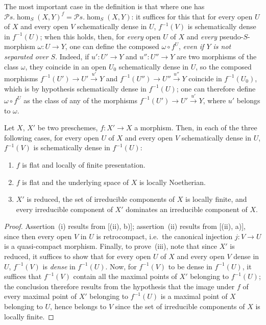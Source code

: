\begin{env}[20.3.4]
\label{IV.20.3.4}
The most important case in the definition  is that where one has $\mathscr{P}\!s.\!\operatorname{hom}_S(X,Y)^f=\mathscr{P}\!s.\!\operatorname{hom}_S(X,Y)$:
it suffices for this that for every open $U$ of $X$ and every open $V$ schematically dense in $U$, $f^{-1}(V)$ is schematically dense in $f^{-1}(U)$;
when this holds, then, for \emph{every} open $U$ of $X$ and \emph{every} pseudo-$S$-morphism $\omega:U\to Y$, one can define the composed $\omega\circ f^U$, \emph{even if $Y$ is not separated over $S$}.
Indeed, if $u':U'\to Y$ and $u'':U''\to Y$ are two morphisms of the class $\omega$, they coincide in an open $U_0$ schematically dense in $U$, so the composed morphisms $f^{-1}(U')\to U'\xrightarrow{u'}Y$ and $f^{-1}(U'')\to U''\xrightarrow{u''}Y$ coincide in $f^{-1}(U_0)$, which is by hypothesis schematically dense in $f^{-1}(U)$;
one can therefore define $\omega\circ f^U$ as the class of any of the morphisms $f^{-1}(U')\to U'\xrightarrow{u'}Y$, where $u'$ belongs to $\omega$.
\end{env}

\begin{proposition}[20.3.5]
\label{IV.20.3.5}
Let $X$, $X'$ be two preschemes, $f:X'\to X$ a morphism.
Then, in each of the three following cases, for every open $U$ of $X$ and every open $V$ schematically dense in $U$, $f^{-1}(V)$ is schematically dense in $f^{-1}(U)$:
\begin{enumerate}[label=\emph{(\roman*)}]
  \item $f$ is flat and locally of finite presentation.
  \item $f$ is flat and the underlying space of $X$ is locally Noetherian.
  \item $X'$ is reduced, the set of irreducible components of $X$ is locally finite, and every irreducible component of $X'$ dominates an irreducible component of $X$.
\end{enumerate}
\end{proposition}

\begin{proof}
Assertion~(i) results from [(ii), b)];
assertion~(ii) results from [(ii), a)], since then every open $V$ in $U$ is retrocompact, i.e.\ the canonical injection $j:V\to U$ is a quasi-compact morphism.
Finally, to prove~(iii), note that since $X'$ is reduced, it suffices to show that for every open $U$ of $X$ and every open $V$ dense in $U$, $f^{-1}(V)$ is \emph{dense} in $f^{-1}(U)$.
Now, for $f^{-1}(V)$ to be dense in $f^{-1}(U)$, it suffices that $f^{-1}(V)$ contain all the maximal points of $X'$ belonging to $f^{-1}(U)$;
  the conclusion therefore results from the hypothesis that the image under $f$ of every
maximal point of $X'$ belonging to $f^{-1}(U)$ is a maximal point of $X$ belonging to $U$, hence belongs to $V$ since the set of irreducible components of $X$ is locally finite.
\end{proof}

